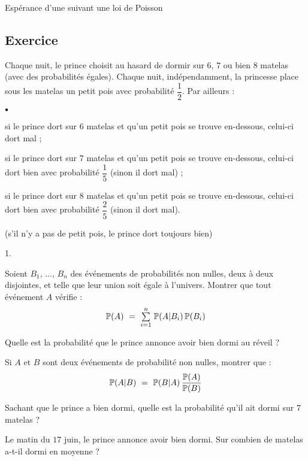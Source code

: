 \documentclass[11pt]{article}%
\begin{document}
\noindent
Espérance d'une \var suivant une loi de Poisson


\subsection*{Exercice} %

\noindent
Chaque nuit, le prince choisit au hasard de dormir sur $6$, $7$ ou bien $8$ matelas (avec des probabilités égales). Chaque nuit, indépendamment, la princesse place sous les matelas un petit pois avec probabilité $\dfrac{1}{2}$. Par ailleurs :
\begin{noliste}{$\scriptstyle \bullet$}
  \item si le prince dort sur $6$ matelas et qu'un petit pois se trouve en-dessous, celui-ci dort mal ;
  
  \item si le prince dort sur $7$ matelas et qu'un petit pois se trouve en-dessous, celui-ci dort bien avec probabilité $\dfrac{1}{5}$ (sinon il dort mal) ;
  
  \item si le prince dort sur $8$ matelas et qu'un petit pois se trouve en-dessous, celui-ci dort bien avec probabilité $\dfrac{2}{5}$ (sinon il dort mal).
\end{noliste}
(s'il n'y a pas de petit pois, le prince dort toujours bien)
\begin{noliste}{1.}
  \item Soient $B_1$, $\ldots$, $B_n$ des événements de probabilités non nulles, deux à deux disjointes, et telle que leur union soit égale à l'univers. Montrer que tout événement $A$ vérifie :
  \[
   \mathbb{P}(A) \ = \ {\textstyle\sum\limits_{i=1}^{n}}\hspace{.1cm} \mathbb{P}(A \vert B_i) \, \mathbb{P}(B_i)
  \]
  
  \item Quelle est la probabilité que le prince annonce avoir bien dormi au réveil ?
  
  \item Si $A$ et $B$ sont deux événements de probabilité non nulles, montrer que :
  \[
   \mathbb{P}(A \vert B) \ = \ \mathbb{P}(B \vert A) \, \dfrac{\mathbb{P}(A)}{\mathbb{P}(B)}
  \]
  
  \item Sachant que le prince a bien dormi, quelle est la probabilité qu'il ait dormi sur $7$ matelas ?
  
  \item Le matin du $17$ juin, le prince annonce avoir bien dormi. Sur combien de matelas a-t-il dormi en moyenne ?
\end{noliste}
\end{document}
